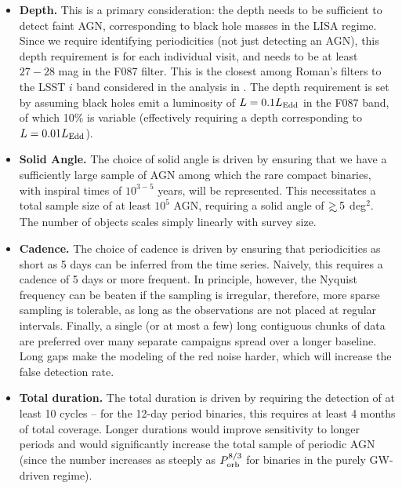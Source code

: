 \documentclass[tightenlines,superscriptaddress,amsmath,amssymb,prl,12pt]{revtex4-1}
\newcommand\gsim{\mathrel{\rlap{\lower4pt\hbox{\hskip1pt$\sim$}}
        \raise1pt\hbox{$>$}}}
\begin{document}
\begin{itemize}

\item {\bf Depth.}  This is a primary consideration: the depth needs
  to be sufficient to detect faint AGN, corresponding to black hole
  masses in the LISA regime.  Since we require identifying
  periodicities (not just detecting an AGN), this depth requirement is
  for each individual visit, and needs to be at least $27-28$ mag in
  the F087 filter. This is the closest among Roman's filters to the
  LSST $i$ band considered in the analysis in \cite{Xin+2021}. The
  depth requirement is set by assuming black holes emit a luminosity
  of $L=0.1 L_{\rm Edd}$ in the F087 band, of which 10\% is variable
  (effectively requiring a depth corresponding to $L=0.01 L_{\rm
    Edd}$).

\item {\bf Solid Angle.}  The choice of solid angle is driven by
  ensuring that we have a sufficiently large sample of AGN among which
  the rare compact binaries, with inspiral times of $10^{3-5}$ years,
  will be represented.  This necessitates a total sample size of at
  least $10^5$ AGN, requiring a solid angle of $\gsim 5$ deg$^2$.  The
  number of objects scales simply linearly with survey size.

\item {\bf Cadence.}  The choice of cadence is driven by ensuring that
  periodicities as short as 5 days can be inferred from the time
  series.  Naively, this requires a cadence of 5 days or more
  frequent. In principle, however, the Nyquist frequency can be beaten
  if the sampling is irregular, therefore, more sparse sampling is
  tolerable, as long as the observations are not placed at regular
  intervals.  Finally, a single (or at most a few) long contiguous
  chunks of data are preferred over many separate campaigns spread
  over a longer baseline. Long gaps make the modeling of the red noise
  harder, which will increase the false detection rate.

\item {\bf Total duration.}  The total duration is driven by requiring
  the detection of at least 10 cycles -- for the 12-day period
  binaries, this requires at least 4 months of total coverage. Longer
  durations would improve sensitivity to longer periods and would
  significantly increase the total sample of periodic AGN (since the
  number increases as steeply as $P_{\rm orb}^{8/3}$ for binaries in
  the purely GW-driven regime).


\end{itemize}
\end{document}
